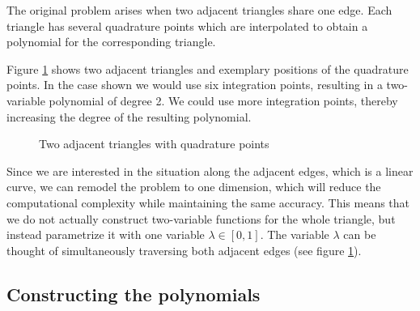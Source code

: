 \documentclass[a4paper, twoside]{article}
\begin{document}
The original problem arises when two adjacent triangles share one edge.
Each triangle has several quadrature points which are interpolated to obtain a polynomial for the corresponding triangle.

Figure \ref{fig:two-triangles-and-some-support-points} shows two adjacent triangles and exemplary positions of the quadrature points.
In the case shown we would use six integration points, resulting in a two-variable polynomial of degree 2. We could use more integration points, thereby increasing the degree of the resulting polynomial.

\begin{figure}[ht]
  \centering
  \caption{Two adjacent triangles with quadrature points}
  \label{fig:two-triangles-and-some-support-points}
\end{figure}

Since we are interested in the situation along the adjacent edges, which is a linear curve, we can remodel the problem to one dimension, which will reduce the computational complexity while maintaining the same accuracy. This means that we do not actually construct two-variable functions for the whole triangle, but instead parametrize it with one variable $\lambda \in [0,1]$. The variable $\lambda$ can be thought of simultaneously traversing both adjacent edges (see figure \ref{fig:two-triangles-and-some-support-points}).

\subsection{Constructing the polynomials}
\label{sec:constructing-polynomials}
\end{document}
